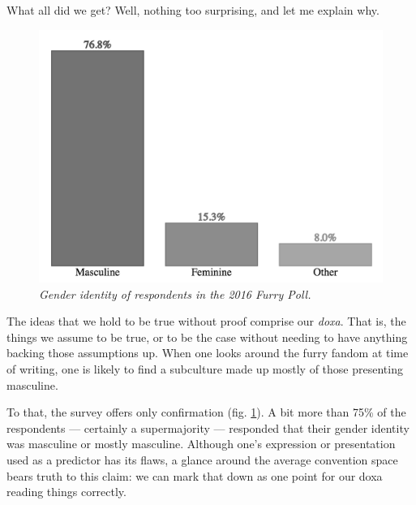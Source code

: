 What all did we get?  Well, nothing too surprising, and let me explain why.

\begin{figure}
  \centering
  \includegraphics[scale=0.45]{assets/identity.png}
  \caption{\textit{Gender identity of respondents in the 2016 Furry Poll.}}
  \label{fig:identity}
\end{figure}

The ideas that we hold to be true without proof comprise our \textit{doxa}. That is, the things we assume to be true, or to be the case without needing to have anything backing those assumptions up. When one looks around the furry fandom at time of writing, one is likely to find a subculture made up mostly of those presenting masculine.

To that, the survey offers only confirmation (fig. \ref{fig:identity}). A bit more than 75\% of the respondents --- certainly a supermajority --- responded that their gender identity was masculine or mostly masculine. Although one's expression or presentation used as a predictor has its flaws, a glance around the average convention space bears truth to this claim: we can mark that down as one point for our doxa reading things correctly.

